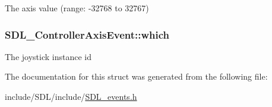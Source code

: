 The axis value (range\-: -\/32768 to 32767) \hypertarget{struct_s_d_l___controller_axis_event_a07087f68ea9d64b50047d65312ee7b94}{
\subsubsection[{which}]{ S\-D\-L\-\_\-\-Controller\-Axis\-Event\-::which}}\label{struct_s_d_l___controller_axis_event_a07087f68ea9d64b50047d65312ee7b94}
The joystick instance id 

The documentation for this struct was generated from the following file\-:\begin{DoxyCompactItemize}
\item 
include/\-S\-D\-L/include/\hyperlink{_s_d_l__events_8h}{S\-D\-L\-\_\-events.\-h}\end{DoxyCompactItemize}
